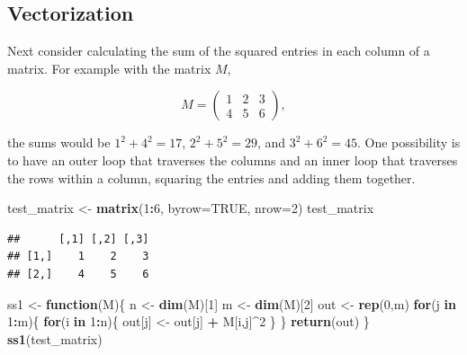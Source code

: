 \documentclass[
]{krantz}
\newenvironment{Shaded}{\begin{snugshade}}{\end{snugshade}}
\newcommand{\ControlFlowTok}[1]{\textcolor[rgb]{0.13,0.29,0.53}{\textbf{#1}}}
\newcommand{\DataTypeTok}[1]{\textcolor[rgb]{0.13,0.29,0.53}{#1}}
\newcommand{\DecValTok}[1]{\textcolor[rgb]{0.00,0.00,0.81}{#1}}
\newcommand{\KeywordTok}[1]{\textcolor[rgb]{0.13,0.29,0.53}{\textbf{#1}}}
\newcommand{\NormalTok}[1]{#1}
\newcommand{\OperatorTok}[1]{\textcolor[rgb]{0.81,0.36,0.00}{\textbf{#1}}}
\newcommand{\OtherTok}[1]{\textcolor[rgb]{0.56,0.35,0.01}{#1}}
\newcommand{\StringTok}[1]{\textcolor[rgb]{0.31,0.60,0.02}{#1}}
\begin{document}
\hypertarget{vectorization}{%
\subsection{Vectorization}\label{vectorization}}

Next consider calculating the sum of the squared entries in each column of a matrix. For example with the matrix \(M\),

\[
M = \left(\begin{array}{ccc}
1 & 2 & 3 \\
4 & 5 & 6
\end{array}\right),
\]

the sums would be \(1^2 + 4^2 = 17\), \(2^2 + 5^2 = 29\), and \(3^2 + 6^2 = 45\).
One possibility is to have an outer loop that traverses the columns and an inner loop that traverses the rows within a column, squaring the entries and adding them together.

\begin{Shaded}
\begin{Highlighting}[]
\NormalTok{test\_matrix \textless{}{-}}\StringTok{ }\KeywordTok{matrix}\NormalTok{(}\DecValTok{1}\OperatorTok{:}\DecValTok{6}\NormalTok{, }\DataTypeTok{byrow=}\OtherTok{TRUE}\NormalTok{, }\DataTypeTok{nrow=}\DecValTok{2}\NormalTok{)}
\NormalTok{test\_matrix}
\end{Highlighting}
\end{Shaded}

\begin{verbatim}
##      [,1] [,2] [,3]
## [1,]    1    2    3
## [2,]    4    5    6
\end{verbatim}

\begin{Shaded}
\begin{Highlighting}[]
\NormalTok{ss1 \textless{}{-}}\StringTok{ }\ControlFlowTok{function}\NormalTok{(M)\{}
\NormalTok{    n \textless{}{-}}\StringTok{ }\KeywordTok{dim}\NormalTok{(M)[}\DecValTok{1}\NormalTok{]}
\NormalTok{    m \textless{}{-}}\StringTok{ }\KeywordTok{dim}\NormalTok{(M)[}\DecValTok{2}\NormalTok{]}
\NormalTok{    out \textless{}{-}}\StringTok{ }\KeywordTok{rep}\NormalTok{(}\DecValTok{0}\NormalTok{,m)}
    \ControlFlowTok{for}\NormalTok{(j }\ControlFlowTok{in} \DecValTok{1}\OperatorTok{:}\NormalTok{m)\{}
        \ControlFlowTok{for}\NormalTok{(i }\ControlFlowTok{in} \DecValTok{1}\OperatorTok{:}\NormalTok{n)\{}
\NormalTok{            out[j] \textless{}{-}}\StringTok{ }\NormalTok{out[j] }\OperatorTok{+}\StringTok{ }\NormalTok{M[i,j]}\OperatorTok{\^{}}\DecValTok{2}
\NormalTok{        \} }
\NormalTok{    \}}
    \KeywordTok{return}\NormalTok{(out)}
\NormalTok{\}}
\KeywordTok{ss1}\NormalTok{(test\_matrix)}
\end{Highlighting}
\end{Shaded}
\end{document}
